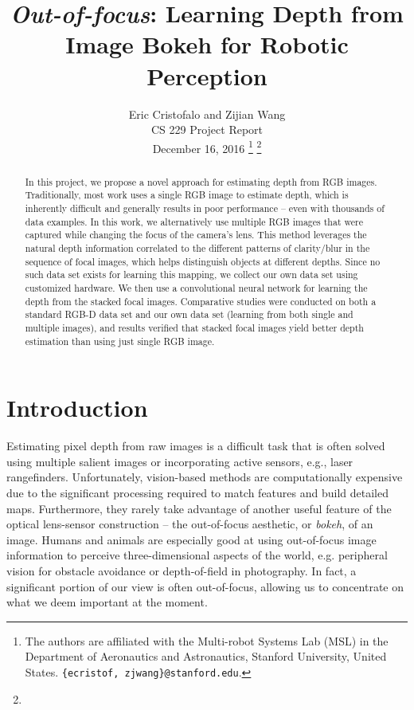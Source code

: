\documentclass[letterpaper, 10 pt, conference]{ieeeconf}  %
\title{\LARGE \bf \textit{Out-of-focus}: Learning Depth from Image Bokeh for Robotic Perception}
\author{Eric Cristofalo and Zijian Wang\\
	CS 229 Project Report \\
	December 16, 2016
\thanks{The authors are affiliated with the Multi-robot Systems Lab (MSL) in the Department of Aeronautics and Astronautics, Stanford University, United States.
    \texttt{\small \{ecristof, zjwang\}@stanford.edu}.}
\thanks{}}
\begin{document}
\maketitle

\thispagestyle{plain} %
\pagestyle{plain}


\begin{abstract}
In this project, we propose a novel approach for estimating depth from RGB images. Traditionally, most work uses a single RGB image to estimate depth, which is inherently difficult and generally results in poor performance -- even with thousands of data examples. In this work, we alternatively use multiple RGB images that were captured while changing the focus of the camera's lens. This method leverages the natural depth information correlated to the different patterns of clarity/blur in the sequence of focal images, which helps distinguish objects at different depths. Since no such data set exists for learning this mapping, we collect our own data set using customized hardware. We then use a convolutional neural network for learning the depth from the stacked focal images. Comparative studies were conducted on both a standard RGB-D data set and our own data set (learning from both single and multiple images), and results verified that stacked focal images yield better depth estimation than using just single RGB image.
\end{abstract}


\section{Introduction}
\label{sec:introduction}

Estimating pixel depth from raw images is a difficult task that is often solved using multiple salient images or incorporating active sensors, e.g., laser rangefinders. Unfortunately, vision-based methods are computationally expensive due to the significant processing required to match features and build detailed maps. Furthermore, they rarely take advantage of another useful feature of the optical lens-sensor construction -- the out-of-focus aesthetic, or \textit{bokeh}, of an image. Humans and animals are especially good at using out-of-focus image information to perceive three-dimensional aspects of the world, e.g. peripheral vision for obstacle avoidance or depth-of-field in photography. In fact, a significant portion of our view is often out-of-focus, allowing us to concentrate on what we deem important at the moment. 
\end{document}
